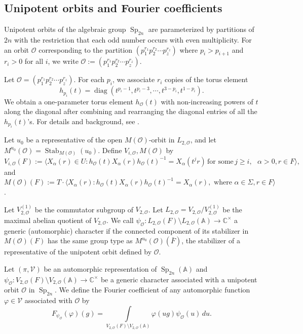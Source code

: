 \documentclass[11pt,notitlepage]{amsart}
\theoremstyle{definition}
\theoremstyle{remark}
\newcommand{\calO}{\mathcal{O}}
\newcommand{\calV}{\mathcal{V}}
\newcommand{\bbA}{\mathbb{A}}
\newcommand{\bbC}{\mathbb{C}}
\DeclareMathOperator{\Sp}{Sp}
\DeclareMathOperator{\diag}{diag}
\begin{document}
  \subsection{Unipotent orbits and Fourier coefficients}\label{sec204}
Unipotent orbits of the algebraic group $\Sp_{2n}$ are parameterized by partitions of $2n$ with the restriction that each odd number occurs with even multiplicity. For an orbit $\calO$ corresponding to the partition $(p_1^{r_1}p_2^{r_2}\cdots p_z^{r_z})$ where $p_i> p_{i+1}$ and $r_i>0$ for all $i$, we write $\calO := (p_1^{r_1}p_2^{r_2}\cdots p_z^{r_z})$.


Let $\calO= (p_1^{r_1}p_2^{r_2}\cdots p_z^{r_z})$. For each $p_i$, we associate $r_i$ copies of the torus element 
\[
h_{p_i}(t) = \diag(t^{p_i-1}, t^{p_i-3}, \cdots, t^{3-p_i}, t^{1-p_i} ).
\]
We obtain a one-parameter torus element $h_{\calO}(t)$ with non-increasing powers of $t$ along the diagonal after combining and rearranging the diagonal entries of all the $h_{p_i}(t)$'s. 
For details and background, see \cite{GIN06}.
 
Let \(u_0\) be a representative of the open
\(M(\calO)\)-orbit in \(L_{2,\calO}\), and let
$M^{u_0}(\calO)
=
\operatorname{Stab}_{M(\calO)}(u_0)$. Define $V_{i,\mathcal{O}},M(\mathcal{O})$ by
\[
V_{i,\calO}(F):= \langle X_{\alpha}(r)\in U : h_\calO(t)X_\alpha(r)h_\calO(t)^{-1} =X_\alpha(t^jr) \, \text{for some}\, j\geqslant i,\text{ }\alpha>0, r\in F\rangle,
\]
and
$M(\calO)(F) := T\cdot \langle X_{\alpha}(r):  h_\calO(t)X_\alpha(r)h_\calO(t)^{-1} =X_\alpha(r),\text{ where }\alpha\in\Sigma, r\in F\rangle$.

Let $V_{2,\calO}^{(1)}$ be the commutator subgroup of $ V_{2,\calO}$. 
Let $L_{2,\calO} =V_{2,\calO}/V_{2,\calO}^{(1)}$ be the maximal abelian quotient of $V_{2,\calO}$. 
We call $\psi_{\calO}: L_{2,\calO}(F)\setminus L_{2,\calO}(\bbA) \rightarrow \bbC^\times$ a generic (automorphic) character if the connected component of its stabilizer in $M(\calO)(F)$ has the same group type as $M^{u_0}(\calO)(\bar{F})$, the stabilizer of a representative of the unipotent orbit defined by $\mathcal{O}$.

Let $(\pi,\calV)$ be an automorphic representation of $\Sp_{2n}(\bbA)$ and $\psi_\calO:V_{2,\calO}(F)\setminus V_{2,\calO}(\bbA) \rightarrow \bbC^\times $ be a generic character associated with a unipotent orbit $\calO$ in $\Sp_{2n}$. We define the Fourier coefficient of any automorphic function $\varphi \in \calV$ associated with $\calO$ by
	\begin{equation}
F_{\psi_\calO}(\varphi)(g) = \int\limits_{V_{2,\calO}(F)\setminus V_{2,\calO}(\bbA)}\varphi(ug)\psi_\calO(u) \,du.
	\end{equation}
\end{document}
